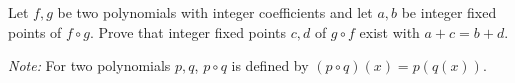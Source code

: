 Let $f,g$ be two polynomials with integer coefficients and let $a,b$ be integer fixed points
of $f \circ g$. Prove that integer fixed points $c,d$ of $g \circ f$ exist with $a+c=b+d$.

\emph{Note:} For two polynomials $p,q$, $p\circ q$ is defined by $(p\circ q)(x) = p(q(x))$.
